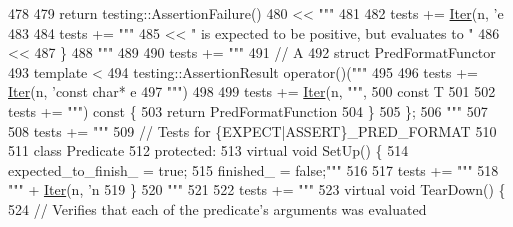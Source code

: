 \begin{DoxyCode}
{{{{{{{{{{{{{{{{{{{{{{{{{{{{478 \textcolor{stringliteral}{}
479 \textcolor{stringliteral}{  return testing::AssertionFailure()}
480 \textcolor{stringliteral}{      << """} %
481 
482   tests += \hyperlink{namespacegen__gtest__pred__impl_ac016218b7c9437d1d5ac85c574c83069}{Iter}(n, \textcolor{stringliteral}{'e%
483 
484   tests += \textcolor{stringliteral}{"""}
485 \textcolor{stringliteral}{      << " is expected to be positive, but evaluates to "}
486 \textcolor{stringliteral}{      << %
487 \textcolor{stringliteral}{\}}
488 \textcolor{stringliteral}{"""} %
489 
490   tests += \textcolor{stringliteral}{"""}
491 \textcolor{stringliteral}{// A %
492 \textcolor{stringliteral}{struct PredFormatFunctor%
493 \textcolor{stringliteral}{  template <%
494 \textcolor{stringliteral}{  testing::AssertionResult operator()("""} %
495 
496   tests += \hyperlink{namespacegen__gtest__pred__impl_ac016218b7c9437d1d5ac85c574c83069}{Iter}(n, \textcolor{stringliteral}{'const char* e%
497 \textcolor{stringliteral}{                                      """})
498 
499   tests += \hyperlink{namespacegen__gtest__pred__impl_ac016218b7c9437d1d5ac85c574c83069}{Iter}(n, \textcolor{stringliteral}{""",}
500 \textcolor{stringliteral}{                                      const T%
501 
502   tests += \textcolor{stringliteral}{""") const \{}
503 \textcolor{stringliteral}{    return PredFormatFunction%
504 \textcolor{stringliteral}{  \}}
505 \textcolor{stringliteral}{\};}
506 \textcolor{stringliteral}{"""} %
507 
508   tests += \textcolor{stringliteral}{"""}
509 \textcolor{stringliteral}{// Tests for \{EXPECT|ASSERT\}\_PRED\_FORMAT%
510 \textcolor{stringliteral}{}
511 \textcolor{stringliteral}{class Predicate%
512 \textcolor{stringliteral}{ protected:}
513 \textcolor{stringliteral}{  virtual void SetUp() \{}
514 \textcolor{stringliteral}{    expected\_to\_finish\_ = true;}
515 \textcolor{stringliteral}{    finished\_ = false;"""} %
516 
517   tests += \textcolor{stringliteral}{"""}
518 \textcolor{stringliteral}{    """} + \hyperlink{namespacegen__gtest__pred__impl_ac016218b7c9437d1d5ac85c574c83069}{Iter}(n, \textcolor{stringliteral}{'n%
519 \textcolor{stringliteral}{  \}}
520 \textcolor{stringliteral}{"""}
521 
522   tests += \textcolor{stringliteral}{"""}
523 \textcolor{stringliteral}{  virtual void TearDown() \{}
524 \textcolor{stringliteral}{    // Verifies that each of the predicate's arguments was evaluated}
}}}}}}}}}}}}}}}}}}}}}}}}}}}}}}}}}}}}}}}
\end{DoxyCode}
